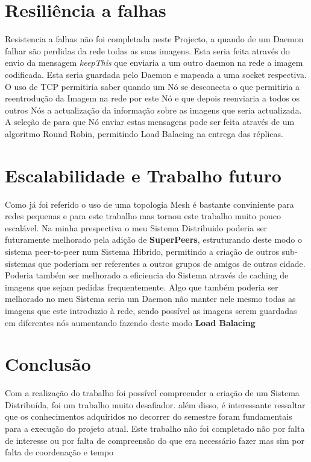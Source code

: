 \documentclass[12pt, letterpaper, twoside]{article}
\begin{document}
	\section{Resiliência a falhas}
	
	Resistencia a falhas não foi completada neste Projecto, a quando de um Daemon falhar são perdidas da rede todas as suas imagens. Esta seria feita através do envio da mensagem \textit{keepThis} que enviaria a um outro daemon na rede a imagem codificada. Esta seria guardada pelo Daemon e mapeada a uma socket respectiva. O uso de TCP permitiria saber quando um Nó se desconecta o que permitiria a reentrodução da Imagem na rede por este Nó e que depois reenviaria a todos os outros Nós a actualização da informação sobre as imagens que seria actualizada. 
	\noindent A seleção de para que Nó enviar estas mensagens pode ser feita através de um algoritmo Round Robin, permitindo Load Balacing na entrega das réplicas.
	
	\section{Escalabilidade e Trabalho futuro}
	
	Como já foi referido o uso de uma topologia Mesh é bastante conviniente para redes pequenas e para este trabalho mas tornou este trabalho muito pouco escalável. Na minha prespectiva o meu Sistema Distribuido poderia ser futuramente melhorado pela adição de \textbf{SuperPeers}, estruturando deste modo o sistema peer-to-peer num Sistema Hibrido, permitindo a criação de outros sub-sistemas que poderiam ser referentes a outros grupos de amigos de outras cidade.
	\noindent Poderia também ser melhorado a eficiencia do Sistema através de caching de imagens que sejam pedidas frequentemente.
	\noindent Algo que também poderia ser melhorado no meu Sistema seria um Daemon não manter nele mesmo todas as imagens que este introduzio à rede, sendo possível as imagens serem guardadas em diferentes nós aumentando fazendo deste modo \textbf{Load Balacing}
	
	\section{Conclusão}
	
Com a realização do trabalho foi possível compreender a criação de um Sistema Distribuída, foi um trabalho muito desafiador. além disso, é interessante ressaltar que os conhecimentos adquiridos no decorrer do semestre foram fundamentais para a execução do projeto atual. Este trabalho não foi completado não por falta de interesse ou por falta de compreensão do que era necessário fazer mas sim por falta de coordenação e tempo 
		
\end{document}
